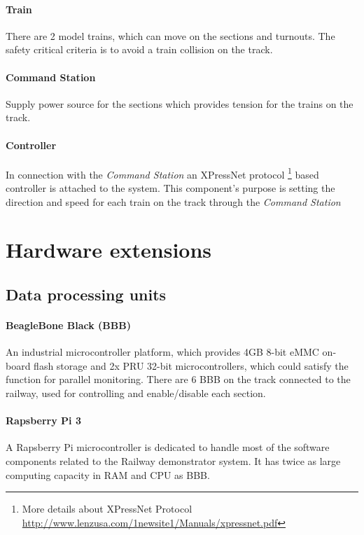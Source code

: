 \paragraph{Train}
There are 2 model trains, which can move on the sections and turnouts. The safety critical criteria is to avoid a train collision on the track.


\paragraph{Command Station}
Supply power source for the sections which provides tension for the trains on the track.
\paragraph{Controller}
In connection with the \textit{Command Station} an XPressNet protocol \footnote{More details about XPressNet Protocol \url{http://www.lenzusa.com/1newsite1/Manuals/xpressnet.pdf}} based controller is attached to the system. This component's purpose is setting the direction and speed for each train on the track through the \textit{Command Station}

\section{Hardware extensions}
\subsection{Data processing units}

\paragraph{BeagleBone Black (BBB)}
An industrial microcontroller platform, which provides 4GB 8-bit eMMC on-board flash storage and 2x PRU 32-bit microcontrollers, which could satisfy the function for parallel monitoring. There are 6 BBB on the track connected to the railway, used for controlling and enable/disable each section.
\paragraph{Rapsberry Pi 3}
A Rapsberry Pi microcontroller is dedicated to handle most of the software components related to the Railway demonstrator system. It has twice as large computing capacity in RAM and CPU as BBB.
